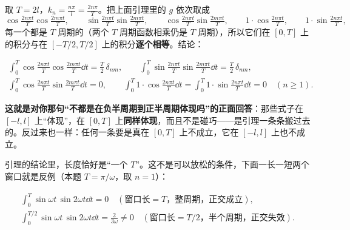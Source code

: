\documentclass[11pt]{ctexart}
\begin{document}
\noindent 取 $T=2l$，$k_n=\frac{n\pi}{l}=\frac{2n\pi}{T}$。把上面引理里的 $g$ 依次取成
\[
\cos\tfrac{2n\pi t}{T}\cos\tfrac{2m\pi t}{T},\qquad
\sin\tfrac{2n\pi t}{T}\sin\tfrac{2m\pi t}{T},\qquad
\cos\tfrac{2n\pi t}{T}\sin\tfrac{2m\pi t}{T},\qquad
1\cdot\cos\tfrac{2n\pi t}{T},\qquad
1\cdot\sin\tfrac{2n\pi t}{T},
\]
每一个都是 $T$ 周期的（两个 $T$ 周期函数相乘仍是 $T$ 周期），所以它们在 $[0,T]$ 上的积分与在 $[-T/2,T/2]$ 上的积分\textbf{逐个相等}。结论：

\begin{gather*}
\int_{0}^{T}\cos\tfrac{2n\pi t}{T}\cos\tfrac{2m\pi t}{T}\dd t=\frac T2\,\delta_{nm},\qquad
\int_{0}^{T}\sin\tfrac{2n\pi t}{T}\sin\tfrac{2m\pi t}{T}\dd t=\frac T2\,\delta_{nm},\\
\int_{0}^{T}\cos\tfrac{2n\pi t}{T}\sin\tfrac{2m\pi t}{T}\dd t=0,\qquad
\int_{0}^{T}1\cdot\cos\tfrac{2n\pi t}{T}\dd t=\int_{0}^{T}1\cdot\sin\tfrac{2n\pi t}{T}\dd t=0\quad(n\ge1).
\end{gather*}


\textbf{这就是对你那句“不都是在负半周期到正半周期体现吗”的正面回答}：那些式子在 $[-l,l]$ 上“体现”，在 $[0,T]$ 上\textbf{同样体现}，而且不是碰巧——是引理一条条搬过去的。反过来也一样：任何一条要是真在 $[0,T]$ 上不成立，它在 $[-l,l]$ 上也不成立。



引理的结论里，长度恰好是“一个 $T$”。这不是可以放松的条件，下面一长一短两个窗口就是反例（本题 $T=\pi/\omega$，取 $n=1$）：

\begin{gather*}
\int_{0}^{T}\sin\omega t\,\sin2\omega t\dd t=0
\quad(\text{窗口长}=T\text{，整周期，正交成立}),\\
\int_{0}^{T/2}\sin\omega t\,\sin2\omega t\dd t=\frac{2}{3\omega}\ne0
\quad(\text{窗口长}=T/2\text{，半个周期，正交失效}).
\end{gather*}
\end{document}
